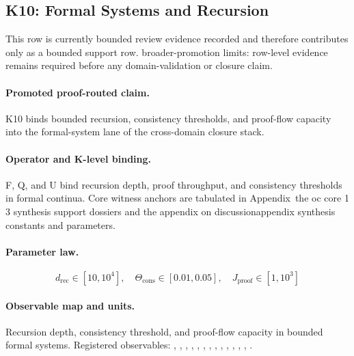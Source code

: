 \subsection{K10: Formal Systems and Recursion}
\label{sec:oc-core-1-3-synthesis-k10}
This row is currently bounded review evidence recorded and therefore contributes only as a bounded support row.
broader-promotion limits: row-level evidence remains required before any domain-validation or closure claim.

\paragraph{Promoted proof-routed claim.}
K10 binds bounded recursion, consistency thresholds, and proof-flow capacity into the formal-system lane of the cross-domain closure stack.

\paragraph{Operator and K-level binding.}
F, Q, and U bind recursion depth, proof throughput, and consistency thresholds in formal continua.
Core witness anchors are tabulated in Appendix~the oc core 1 3 synthesis support dossiers and the appendix on discussionappendix synthesis constants and parameters.

\paragraph{Parameter law.}
\[
d_{\mathrm{rec}} \in [10,10^4],\quad \Theta_{\mathrm{cons}} \in [0.01,0.05],\quad J_{\mathrm{proof}} \in [1,10^3]
\]

\paragraph{Observable map and units.}
Recursion depth, consistency threshold, and proof-flow capacity in bounded formal systems.
Registered observables: , \allowbreak {}, \allowbreak {}, \allowbreak {}, \allowbreak {}, \allowbreak {}, \allowbreak {}, \allowbreak {}, \allowbreak {}, \allowbreak {}, \allowbreak {}, \allowbreak {}, \allowbreak {}, \allowbreak {}.

